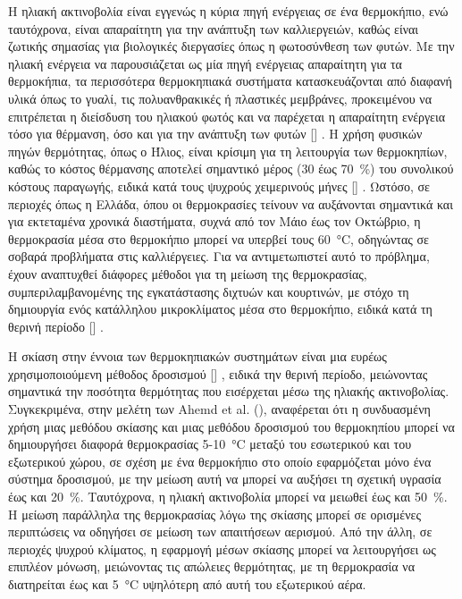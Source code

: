 \documentclass[12pt, a4paper]{report} %
\DeclareRobustCommand{\lcitep}[1]{%
  \english{[\cite{#1}]}%
}
\newcommand{\english}{\foreignlanguage{english}}
\begin{document}
Η ηλιακή ακτινοβολία είναι εγγενώς η κύρια πηγή ενέργειας σε ένα θερμοκήπιο, ενώ ταυτόχρονα, είναι απαραίτητη για την 
ανάπτυξη των καλλιεργειών, καθώς είναι ζωτικής σημασίας για βιολογικές διεργασίες όπως η φωτοσύνθεση των φυτών. Με την 
ηλιακή ενέργεια να παρουσιάζεται ως μία πηγή ενέργειας απαραίτητη για τα θερμοκήπια, τα περισσότερα θερμοκηπιακά 
συστήματα κατασκευάζονται από διαφανή υλικά όπως το γυαλί, τις πολυανθρακικές ή πλαστικές μεμβράνες, προκειμένου να 
επιτρέπεται η διείσδυση του ηλιακού φωτός και να παρέχεται η απαραίτητη ενέργεια τόσο για θέρμανση, όσο και για την 
ανάπτυξη των φυτών \lcitep{eisagwgi_alg_bib10}. Η χρήση φυσικών πηγών θερμότητας, όπως ο Ήλιος, είναι κρίσιμη για τη 
λειτουργία των θερμοκηπίων, καθώς το κόστος θέρμανσης αποτελεί σημαντικό μέρος (30 έως \SI{70}{\percent}) του συνολικού 
κόστους παραγωγής, ειδικά κατά τους ψυχρούς χειμερινούς μήνες \lcitep{eisagwgi_alg_bib11}. Ωστόσο, σε περιοχές όπως η 
Ελλάδα, όπου οι θερμοκρασίες τείνουν να αυξάνονται σημαντικά και για εκτεταμένα χρονικά διαστήματα, συχνά από τον Μάιο 
έως τον Οκτώβριο, η θερμοκρασία μέσα στο θερμοκήπιο μπορεί να υπερβεί τους \SI{60}{\degreeCelsius}, οδηγώντας σε σοβαρά 
προβλήματα στις καλλιέργειες. Για να αντιμετωπιστεί αυτό το πρόβλημα, έχουν αναπτυχθεί διάφορες μέθοδοι για τη μείωση της 
θερμοκρασίας, συμπεριλαμβανομένης της εγκατάστασης διχτυών και κουρτινών, με στόχο τη δημιουργία ενός κατάλληλου 
μικροκλίματος μέσα στο θερμοκήπιο, ειδικά κατά τη θερινή περίοδο \lcitep{eisagwgi_alg_bib12}.  

Η σκίαση στην έννοια των θερμοκηπιακών συστημάτων είναι μια ευρέως χρησιμοποιούμενη μέθοδος δροσισμού \lcitep{eisagwgi_adv_alg_bib3}, 
ειδικά την θερινή περίοδο, μειώνοντας σημαντικά την ποσότητα θερμότητας που εισέρχεται μέσω της ηλιακής ακτινοβολίας. 
Συγκεκριμένα, στην μελέτη των \english{Ahemd et al.} (\citeyear{eisagwgi_alg_bib13}), αναφέρεται ότι η συνδυασμένη 
χρήση μιας μεθόδου σκίασης και μιας μεθόδου δροσισμού του θερμοκηπίου μπορεί να δημιουργήσει διαφορά θερμοκρασίας 
5-\SI{10}{\degreeCelsius} μεταξύ του εσωτερικού και του εξωτερικού χώρου, σε σχέση με ένα θερμοκήπιο στο οποίο 
εφαρμόζεται μόνο ένα σύστημα δροσισμού, με την μείωση αυτή να μπορεί να αυξήσει τη σχετική υγρασία έως και 
\SI{20}{\percent}. Ταυτόχρονα, η ηλιακή ακτινοβολία μπορεί να μειωθεί έως και \SI{50}{\percent}. Η μείωση παράλληλα της 
θερμοκρασίας λόγω της σκίασης μπορεί σε ορισμένες περιπτώσεις να οδηγήσει σε μείωση των απαιτήσεων αερισμού. Από την άλλη, 
σε περιοχές ψυχρού κλίματος, η εφαρμογή μέσων σκίασης μπορεί να λειτουργήσει ως επιπλέον μόνωση, μειώνοντας τις απώλειες 
θερμότητας, με τη θερμοκρασία να διατηρείται έως και \SI{5}{\degreeCelsius} υψηλότερη από αυτή του εξωτερικού αέρα.
\end{document}
